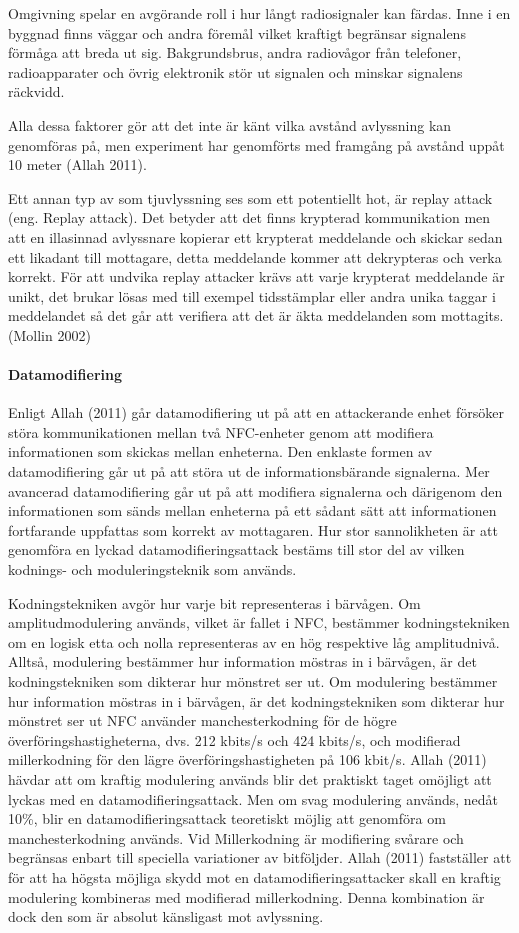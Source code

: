 \documentclass[11pt]{article}
\begin{document}
Omgivning spelar en avgörande roll i hur långt radiosignaler kan färdas. Inne i en byggnad finns väggar och andra föremål vilket kraftigt begränsar signalens förmåga att breda ut sig. Bakgrundsbrus, andra radiovågor från telefoner, radioapparater och övrig elektronik stör ut signalen och minskar signalens räckvidd.

Alla dessa faktorer gör att det inte är känt vilka avstånd avlyssning kan genomföras på, men experiment har genomförts med framgång på avstånd uppåt 10 meter  (Allah 2011).

Ett annan typ av som tjuvlyssning ses som ett potentiellt hot, är replay attack (eng. Replay attack). Det betyder att det finns krypterad kommunikation men att en illasinnad avlyssnare kopierar ett krypterat meddelande och skickar sedan ett likadant till mottagare, detta meddelande kommer att dekrypteras och verka korrekt. För att undvika replay attacker krävs att varje krypterat meddelande är unikt, det brukar lösas med till exempel tidsstämplar eller andra unika taggar i meddelandet så det går att verifiera att det är äkta meddelanden som mottagits. (Mollin 2002)

\paragraph{Datamodifiering}
Enligt Allah (2011) går datamodifiering ut på att en attackerande enhet försöker störa kommunikationen mellan två NFC-enheter genom att modifiera informationen som skickas mellan enheterna. Den enklaste formen av datamodifiering går ut på att störa ut de informationsbärande signalerna. Mer avancerad datamodifiering går ut på att modifiera signalerna och därigenom den informationen som sänds mellan enheterna på ett sådant sätt att informationen fortfarande uppfattas som korrekt av mottagaren. Hur stor sannolikheten är att genomföra en lyckad datamodifieringsattack bestäms till stor del av vilken kodnings- och moduleringsteknik som används. 

Kodningstekniken avgör hur varje bit representeras i bärvågen. Om amplitudmodulering används, vilket är fallet i NFC, bestämmer kodningstekniken om en logisk etta och nolla representeras av en hög respektive låg amplitudnivå. Alltså, modulering bestämmer hur information möstras in i bärvågen, är det kodningstekniken som dikterar hur mönstret ser ut. Om modulering bestämmer hur information möstras in i bärvågen, är det kodningstekniken som dikterar hur mönstret ser ut  NFC använder manchesterkodning för de högre överföringshastigheterna, dvs. 212 kbits/s och 424 kbits/s, och modifierad millerkodning för den lägre överföringshastigheten på 106 kbit/s. Allah (2011) hävdar att om kraftig modulering används blir det praktiskt taget omöjligt att lyckas med en datamodifieringsattack. Men om svag modulering används, nedåt 10\%, blir en datamodifieringsattack teoretiskt möjlig att genomföra om manchesterkodning används. Vid Millerkodning är modifiering svårare och begränsas enbart till speciella variationer av bitföljder. Allah (2011) fastställer att för att ha högsta möjliga skydd mot en datamodifieringsattacker skall en kraftig modulering kombineras med modifierad millerkodning. Denna kombination är dock den som är absolut känsligast mot avlyssning.
\end{document}
